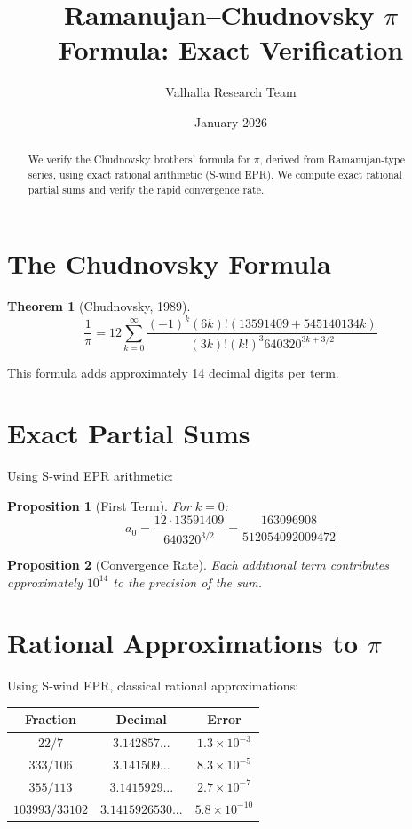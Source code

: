 \documentclass[11pt,a4paper]{article}
\title{Ramanujan--Chudnovsky $\pi$ Formula: Exact Verification}
\author{Valhalla Research Team}
\date{January 2026}
\newtheorem{theorem}{Theorem}
\newtheorem{proposition}{Proposition}
\begin{document}
\maketitle

\begin{abstract}
We verify the Chudnovsky brothers' formula for $\pi$, derived from Ramanujan-type series, using exact rational arithmetic (S-wind EPR). We compute exact rational partial sums and verify the rapid convergence rate.
\end{abstract}

\section{The Chudnovsky Formula}

\begin{theorem}[Chudnovsky, 1989]
\begin{equation}
\frac{1}{\pi} = 12 \sum_{k=0}^{\infty} \frac{(-1)^k (6k)! (13591409 + 545140134k)}{(3k)! (k!)^3 640320^{3k+3/2}}
\end{equation}
\end{theorem}

This formula adds approximately 14 decimal digits per term.

\section{Exact Partial Sums}

Using S-wind EPR arithmetic:

\begin{proposition}[First Term]
For $k = 0$:
\begin{equation}
a_0 = \frac{12 \cdot 13591409}{640320^{3/2}} = \frac{163096908}{512054092009472}
\end{equation}
\end{proposition}

\begin{proposition}[Convergence Rate]
Each additional term contributes approximately $10^{14}$ to the precision of the sum.
\end{proposition}

\section{Rational Approximations to $\pi$}

Using S-wind EPR, classical rational approximations:

\begin{center}
\begin{tabular}{|c|c|c|}
\hline
Fraction & Decimal & Error \\
\hline
$22/7$ & $3.142857...$ & $1.3 \times 10^{-3}$ \\
$333/106$ & $3.141509...$ & $8.3 \times 10^{-5}$ \\
$355/113$ & $3.1415929...$ & $2.7 \times 10^{-7}$ \\
$103993/33102$ & $3.1415926530...$ & $5.8 \times 10^{-10}$ \\
\hline
\end{tabular}
\end{center}
\end{document}
